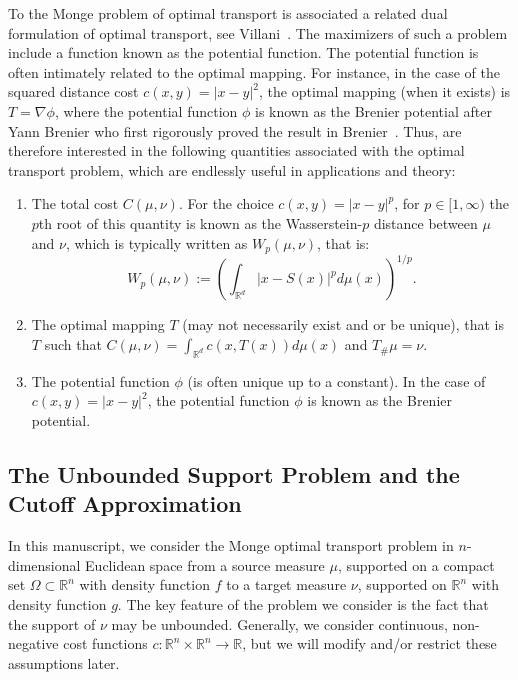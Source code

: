 \documentclass{amsart}
\theoremstyle{lemma}
\theoremstyle{remark}
\begin{document}
To the Monge problem of optimal transport is associated a related dual formulation of optimal transport, see Villani~\cite{Villani1}. The maximizers of such a problem include a function known as the potential function. The potential function is often intimately related to the optimal mapping. For instance, in the case of the squared distance cost $c(x,y) = \vert x - y \vert^2$, the optimal mapping (when it exists) is $T = \nabla \phi$, where the potential function $\phi$ is known as the Brenier potential after Yann Brenier who first rigorously proved the result in Brenier~\cite{brenier}. Thus, are therefore interested in the following quantities associated with the optimal transport problem, which are endlessly useful in applications and theory:
\begin{enumerate}
\item The total cost $C(\mu, \nu)$. For the choice $c(x,y) = \vert x - y \vert^{p}$, for $p \in [1, \infty)$ the $p$th root of this quantity is known as the Wasserstein-$p$ distance between $\mu$ and $\nu$, which is typically written as $W_{p}(\mu, \nu)$, that is:
\begin{equation*}
W_{p}(\mu, \nu) := \left( \int_{\mathbb{R}^d} \vert x - S(x) \vert^{p} d\mu(x) \right)^{1/p}.
\end{equation*}
\item The optimal mapping $T$ (may not necessarily exist and or be unique), that is $T$ such that $C(\mu, \nu) = \int_{\mathbb{R}^d} c(x,T(x)) d\mu(x)$ and $T_{\#} \mu = \nu$.
\item The potential function $\phi$ (is often unique up to a constant). In the case of $c(x,y) = \vert x - y \vert^2$, the potential function $\phi$ is known as the Brenier potential.
\end{enumerate}

\subsection{The Unbounded Support Problem and the Cutoff Approximation}

In this manuscript, we consider the Monge optimal transport problem in $n$-dimensional Euclidean space from a source measure $\mu$, supported on a compact set $\Omega \subset \mathbb{R}^n$ with density function $f$ to a target measure $\nu$, supported on $\mathbb{R}^n$ with density function $g$. The key feature of the problem we consider is the fact that the support of $\nu$ may be unbounded. Generally, we consider continuous, non-negative cost functions $c: \mathbb{R}^n \times \mathbb{R}^n \rightarrow \mathbb{R}$, but we will modify and/or restrict these assumptions later.
\end{document}
